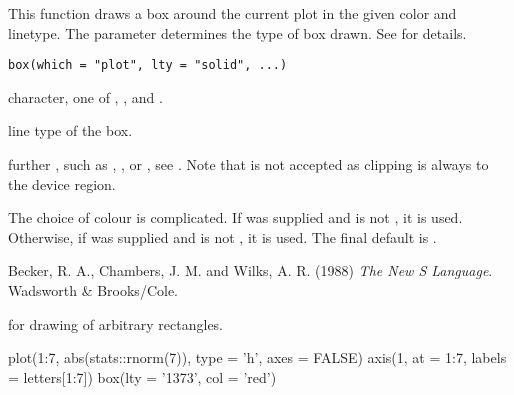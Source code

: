 %
\begin{Description}\relax
This function draws a box around the current plot in the given color
and linetype.  The  parameter determines
the type of box drawn.  See  for details.
\end{Description}
%
\begin{Usage}
\begin{verbatim}
box(which = "plot", lty = "solid", ...)
\end{verbatim}
\end{Usage}
%
\begin{Arguments}
\begin{ldescription}
\item[\code{which}] character, one of , ,
 and .
\item[\code{lty}] line type of the box.
\item[\code{...}] further , such as ,
, or , see .  Note that
 is not accepted as clipping is always to the device
region.
\end{ldescription}
\end{Arguments}
%
\begin{Details}\relax
The choice of colour is complicated.  If  was supplied
and is not , it is used.  Otherwise, if  was supplied
and is not , it is used.  The final default is .
\end{Details}
%
\begin{References}\relax
Becker, R. A., Chambers, J. M. and Wilks, A. R. (1988)
\emph{The New S Language}.
Wadsworth \& Brooks/Cole.
\end{References}
%
\begin{SeeAlso}\relax
{} for drawing of arbitrary rectangles.
\end{SeeAlso}
%
\begin{Examples}
\begin{ExampleCode}
plot(1:7, abs(stats::rnorm(7)), type = 'h', axes = FALSE)
axis(1, at = 1:7, labels = letters[1:7])
box(lty = '1373', col = 'red')
\end{ExampleCode}
\end{Examples}
